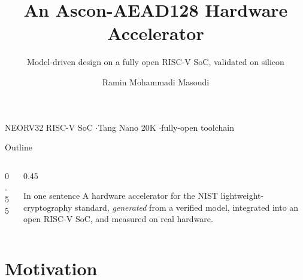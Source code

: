 \documentclass[aspectratio=169,11pt]{beamer}
\title{\textbf{An Ascon-AEAD128 Hardware Accelerator}}
\subtitle{Model-driven design on a fully open RISC-V SoC, validated on silicon}
\author{Ramin Mohammadi Masoudi}
\institute{Politecnico di Milano}
\date{}
\begin{document}
\begin{frame}[plain]
\titlepage
\vspace{-4mm}
\begin{center}\small\color{docblue}
NEORV32 RISC-V SoC \quad$\cdot$\quad Tang Nano 20K \quad$\cdot$\quad fully-open toolchain
\end{center}
\end{frame}

\begin{frame}{Outline}
\vspace{2mm}
\begin{columns}[T]
\begin{column}{0.55\textwidth}
\tableofcontents
\end{column}
\begin{column}{0.45\textwidth}
\begin{block}{In one sentence}
\small A hardware accelerator for the NIST lightweight-cryptography standard,
\emph{generated} from a verified model, integrated into an open RISC-V SoC, and
measured on real hardware.
\end{block}
\end{column}
\end{columns}
\end{frame}

\section{Motivation}
\end{document}
